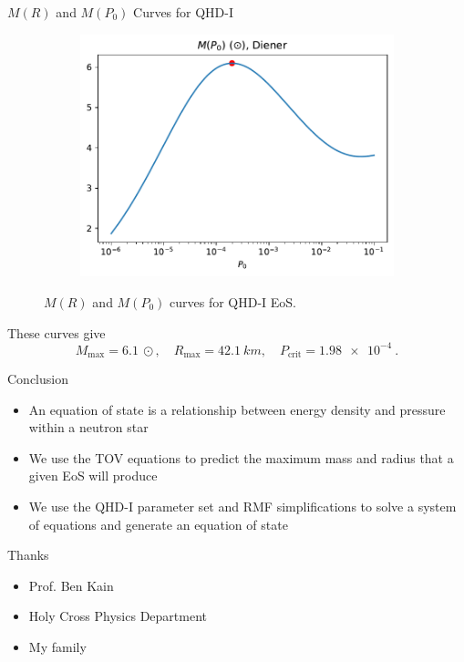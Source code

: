 \documentclass[handout]{beamer}
\begin{document}
\begin{frame}{$M(R)$ and $M(P_0)$ Curves for QHD-I}
\begin{figure}[h!]
\begin{subfigure}{.5\textwidth}
                \includegraphics[width = \textwidth]{../paper/images/qhd1/p0_analysis.pdf}
            \end{subfigure}
            \caption[]{$M(R)$ and $M(P_0)$ curves for QHD-I EoS.}
        \end{figure}\pause
        \vspace{-3pt}
        These curves give \[M_\text{max} = \SI{6.1}{\odot}, \quad R_\text{max} = \SI{42.1}{km}, \quad P_\text{crit} = \SI{1.98e-4}{}.\]
    \end{frame}

    \begin{frame}{Conclusion}
        \begin{itemize}
            \item An equation of state is a relationship between energy density and pressure within a neutron star \pause
            \item We use the TOV equations to predict the maximum mass and radius that a given EoS will produce \pause
            \item We use the QHD-I parameter set and RMF simplifications to solve a system of equations and generate an equation of state
        \end{itemize}
    \end{frame}

    \begin{frame}{Thanks}
        \begin{itemize}
            \item Prof. Ben Kain \pause
            \item Holy Cross Physics Department \pause
            \item My family
        \end{itemize}
    \end{frame}
\end{document}
